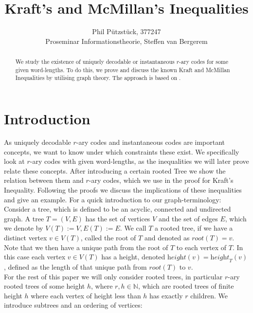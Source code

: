 \documentclass[12pt]{article}
\newcommand{\he}[0]{\textit{height}}
\newcommand{\ro}[0]{\textit{root}}
\begin{document}
\title{Kraft's and McMillan's Inequalities}
\author{Phil Pützstück, 377247\\
Proseminar Informationstheorie, Steffen van Bergerem}
\maketitle

\begin{abstract}
    We study the existence of uniquely decodable or instantaneous $r$-ary codes for some given word-lengths.
    To do this, we prove and discuss the known Kraft and McMillan Inequalities by utilising graph theory.
    The approach is based on \cite{ICT}.
\end{abstract}

\section*{Introduction}
As uniquely decodable $r$-ary codes and instantaneous codes are important concepts,
we want to know under which constraints these exist.
We specifically look at $r$-ary codes with given word-lengths, as the inequalities
we will later prove relate these concepts. After introducing a certain rooted Tree we show the relation between them and $r$-ary codes, which we use in the proof for Kraft's Inequality. Following the proofs we discuss the implications of these inequalities and give an example.
For a quick introduction to our graph-terminology:\\[10pt]
Consider a tree, which is defined to be an acyclic, connected and undirected graph.
A tree $T = (V,E)$ has the set of vertices $V$ and the set of edges $E$, which we denote by $V(T) := V, E(T) := E$.
We call $T$ a rooted tree, if we have a distinct vertex $v \in V(T)$,
called the root of $T$ and denoted as $\ro(T) = v$.
Note that we then have a unique path from the root of $T$ to each vertex of $T$.
In this case each vertex $v \in V(T)$ has a height, denoted $\he(v) = \he_T(v)$,
defined as the length of that unique path from $\ro(T)$ to $v$.\\[10pt]
For the rest of this paper we will only consider rooted trees, in particular $r$-ary rooted trees of some height $h$, where $r,h \in \mathbb{N}$, which
are rooted trees of finite height $h$ where each vertex of height less than $h$ has exactly $r$ children.
We introduce subtrees and an ordering of vertices:
\end{document}
